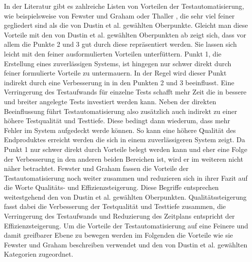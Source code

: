 In der Literatur gibt es zahlreiche Listen von Vorteilen der Testautomatisierung, wie beispielsweise von Fewster und Graham \cite[vgl. S.9 ff.]{fewster_software_1999} oder Thaller \cite[vgl. S.28 ff.]{thaller_software-test_2002}, die sehr viel feiner gegliedert sind als die von Dustin et al. \cite[S.44 ff.]{dustin_software_2001} gewählten Oberpunkte. 
Gleicht man diese Vorteile mit den von Dustin et al. gewählten Oberpunkten ab zeigt sich, dass vor allem die Punkte 2 und 3 gut durch diese repräsentiert werden. Sie lassen sich leicht mit den feiner ausformulierten Vorteilen unterfüttern. Punkt 1, die Erstellung eines zuverlässigen Systems, ist hingegen nur schwer direkt durch feiner formulierte Vorteile zu untermauern. In der Regel wird dieser Punkt indirekt durch eine Verbesserung in in den Punkten 2 und 3 beeinflusst.
Eine Verringerung des Testaufwands für einzelne Tests schafft mehr Zeit die in bessere und breiter angelegte Tests investiert werden kann. Neben der direkten Beeinflussung führt Testautomatisierung also zusätzlich auch indirekt zu einer höhere Testqualität und Testtiefe. Diese bedingt dann wiederum, dass mehr Fehler im System aufgedeckt werde können. So kann eine höhere Qualität des Endproduktes erreicht werden die sich in einem zuverlässigeren System zeigt.
Da Punkt 1 nur schwer direkt durch Vorteile belegt werden kann und eher eine Folge der Verbesserung in den anderen beiden Bereichen ist, wird er im weiteren nicht näher betrachtet.
Fewster und Graham \cite[vgl. S.10]{fewster_software_1999} fassen die Vorteile der Testautomatisierung noch weiter zusammen und reduzieren sich in ihrer Fazit auf die Worte Qualitäts- und Effizienzsteigerung.
Diese Begriffe entsprechen weitestgehend den von Dustin et al. gewählten Oberpunkten. Qualitätssteigerung fasst dabei die Verbesserung der Testqualität und Testtiefe zusammen, die Verringerung des Testaufwands und Reduzierung des Zeitplans entspricht der Effizienzsteigerung. 
Um die Vorteile der Testautomatisierung auf eine Feinere und damit greifbarer Ebene zu bewegen werden im Folgenden die Vorteile wie sie 
Fewster und Graham beschreiben verwendet und den von Dustin et al. gewählten Kategorien zugeordnet.

